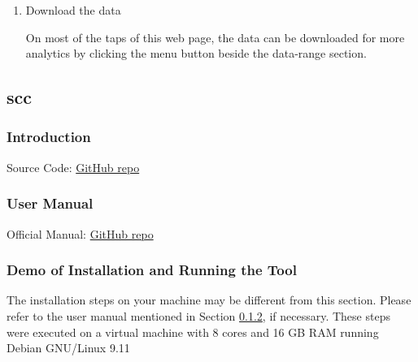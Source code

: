 \documentclass[letterpaper,cleveref]{lipics-v2019}
\begin{document}
\begin{enumerate}
\item Download the data

On most of the taps of this web page, the data can be downloaded for more
analytics by clicking the menu button beside the data-range section.

\end{enumerate}

\subsection{scc}

\subsubsection{Introduction}

Source Code: \href{https://github.com/boyter/scc}{GitHub repo}

\subsubsection{User Manual} \label{scc_manual}

Official Manual: \href{https://github.com/boyter/scc}{GitHub repo}

\subsubsection{Demo of Installation and Running the Tool}

The installation steps on your machine may be different from this section.
Please refer to the user manual mentioned in Section \ref{scc_manual}, if
necessary.  These steps were executed on a virtual machine with 8 cores and 16
GB RAM running Debian GNU/Linux 9.11
\end{document}
